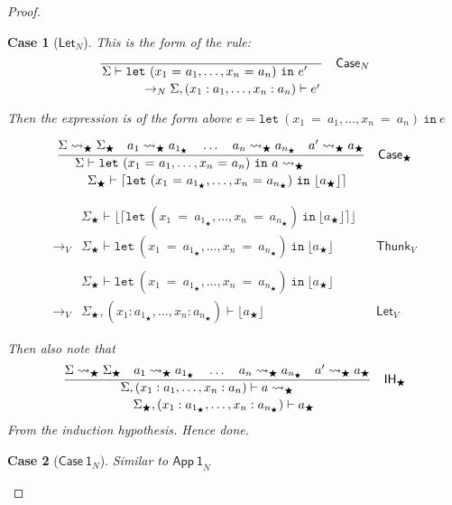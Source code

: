 \documentclass[float=false, crop=false]{standalone}
\newtheorem{case}{Case}
\numberwithin{subcase}{case}
\newcommand{\tlang}{\bigstar}
\newcommand{\thunk}[1]{\lceil #1 \rceil}
\newcommand{\unwrap}[1]{\lfloor #1 \rfloor}
\newcommand{\tcbn}{\rightarrow_N}
\newcommand{\tcbv}{\rightarrow_V}
\newcommand{\tlthunk}{\rightsquigarrow_\tlang}
\begin{document}
\begin{proof}
\begin{case}[$\mathsf{Let}_N$]
    This is the form of the rule:
    \[
  \dfrac{}{\splitdfrac{\Sigma \vdash \mathtt{let}\ 
      (x_1\ \mathtt{=}\ a_1,\dotsc, x_n\ \mathtt{=}\ a_n)\ \mathtt{in}\ e'}
    {\tcbn \Sigma,(x_1:a_1,\dotsc,x_n:a_n) \vdash e'}} \quad \mathsf{Case}_N\]

  Then the expression is of the form above 
  $e = \mathtt{let}\ (x_1\ \mathtt{=}\ a_1,\dotsc, x_n\ \mathtt{=}\ a_n)\ \mathtt{in}\ e$
  
\[\dfrac{\Sigma \tlthunk \Sigma_\tlang \quad a_1  \tlthunk a_{1_\tlang} 
    \quad \dots \quad a_n \tlthunk a_{n_\tlang} \quad a' \tlthunk a_\tlang}
  {\splitdfrac{\Sigma \vdash \mathtt{let}\ (x_1\ \mathtt{=}\ a_1,\dotsc, 
      x_n\ \mathtt{=}\ a_n)\ \mathtt{in}\ a \tlthunk}
    {\Sigma_\tlang \vdash \thunk{\mathtt{let}\ 
        (x_1\ \mathtt{=}\ a_{1_\tlang},\dotsc, x_n\ \mathtt{=}\ a_{n_\tlang})
        \ \mathtt{in}\ \unwrap{a_\tlang}}}} \quad \mathsf{Case}_\tlang\]

\begin{align*} 
  & \Sigma_\tlang \vdash \unwrap{\thunk{\mathtt{let}\ 
        (x_1\ \mathtt{=}\ a_{1_\tlang},\dotsc, x_n\ \mathtt{=}\ a_{n_\tlang})
        \ \mathtt{in}\ \unwrap{a_\tlang}}}\\ \tcbv &\Sigma_\tlang \vdash
    \mathtt{let}\ (x_1\ \mathtt{=}\ a_{1_\tlang},
    \dotsc, x_n\ \mathtt{=}\ a_{n_\tlang})
    \ \mathtt{in}\ \unwrap{a_\tlang} && \mathsf{Thunk}_V \\ \\
  & \Sigma_\tlang \vdash \mathtt{let}\ 
    (x_1\ \mathtt{=}\ a_{1_\tlang},\dotsc, x_n\ \mathtt{=}\ a_{n_\tlang})
    \ \mathtt{in}\ \unwrap{a_\tlang}\\ \tcbv &\Sigma_\tlang,
    (x_1:a_{1_\tlang},\dotsc,x_n:a_{n_\tlang}) \vdash 
    \unwrap{a_\tlang} && \mathsf{Let}_V
\end{align*}

Then also note that 
\[
  \dfrac{\Sigma \tlthunk \Sigma_\tlang \quad a_1  
    \tlthunk a_{1_\tlang} \quad \dots \quad a_n 
    \tlthunk a_{n_\tlang} \quad a' \tlthunk a_\tlang}
  {\splitdfrac{\Sigma,(x_1:a_1,\dotsc,x_n:a_n) \vdash a \tlthunk}
   {\Sigma_\tlang,(x_1:a_{1_\tlang},\dotsc,x_n:a_{n_\tlang}) \vdash a_\tlang} }
    \quad \mathsf{IH}_\tlang\] From the induction hypothesis.
    Hence done.
\end{case}

\begin{case}[$\mathsf{Case\ 1}_N$]
Similar to $\mathsf{App\ 1}_N$
\end{case}


\end{proof}
\end{document}
